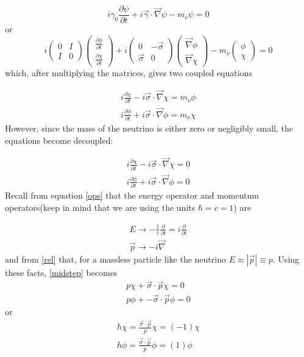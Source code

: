 \documentclass[12pt]{book}
\begin{document}
\begin{equation}
 i\gamma_{0}\frac{\partial\psi}{\partial t}+i\vec{\gamma}\cdot \vec{\nabla}\psi-m_{\nu}\psi=0
\end{equation}
or
\begin{equation}
 i\left( \begin{array}{cc}
0 & I \\
I & 0 \end{array} \right) \left( \begin{array}{c}
\frac{\partial\phi}{\partial t} \\
\frac{\partial\chi}{\partial t} \end{array} \right)+i\left( \begin{array}{cc}
0 & -\vec{\sigma} \\
\vec{\sigma} & 0 \end{array} \right) \left( \begin{array}{c}
\vec{\nabla}\phi \\
\vec{\nabla}\chi \end{array} \right)-m_{\nu}
\left( \begin{array}{c}
\phi \\
\chi \end{array} \right)=0
\end{equation}
which, after multiplying the matrices, gives two coupled equations

\begin{align}
 i\frac{\partial\chi}{\partial t}-i\vec{\sigma}\cdot \vec{\nabla}\chi=m_{\nu}\phi \\
 i\frac{\partial\phi}{\partial t}+i\vec{\sigma}\cdot \vec{\nabla}\phi=m_{\nu}\chi
\end{align}
However, since the mass of the neutrino is either zero or negligibly small, the equations become decoupled:

\begin{align}\label{midstep}
 i\frac{\partial\chi}{\partial t}-i\vec{\sigma}\cdot \vec{\nabla}\chi=0 \\
 i\frac{\partial\phi}{\partial t}+i\vec{\sigma}\cdot \vec{\nabla}\phi=0
\end{align}
Recall from equation \ref{ops} that the energy operator and momentum operators(keep in mind that we are using the units $\hbar=c=1$) are 

\begin{align}
E \rightarrow -\frac{1}{i} \frac{\partial}{\partial t}= i\frac{\partial}{\partial t} \\
\vec{p} \rightarrow -i\vec{\nabla}
\end{align}
and from \ref{rel} that, for a massless particle like the neutrino $E\approx \left|\vec{p}\right|\equiv p$.
Using these facts, \ref{midstep} becomes
\begin{align}
 p\chi+\vec{\sigma}\cdot \vec{p}\chi=0 \\
 p\phi+-\vec{\sigma}\cdot \vec{p}\phi=0
\end{align}
or
\begin{align}\label{twocomp}
 h\chi=\frac{\vec{\sigma}\cdot \vec{p}}{p}\chi=(-1)\chi \\
 h\phi= \frac{\vec{\sigma}\cdot \vec{p}}{p}\phi=(1)\phi
\end{align}
\end{document}
